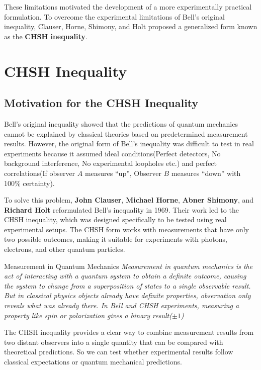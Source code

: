 \documentclass[14pt,a4paper]{extarticle}
\begin{document}
These limitations motivated the development of a more experimentally practical formulation. To overcome the experimental limitations of Bell’s original inequality, Clauser, Horne, Shimony, and Holt proposed a generalized form known as the \textbf{CHSH inequality}.

\section{CHSH Inequality}
\subsection{Motivation for the CHSH Inequality}
Bell’s original inequality showed that the predictions of quantum mechanics cannot be explained by classical theories based on predetermined measurement results. However, the original form of Bell’s inequality was difficult to test in real experiments because it assumed ideal conditions(Perfect detectors, No background interference, No experimental loopholes etc.) and perfect correlations(If observer $A$ measures “up”, Observer $B$ measures “down” with 100\% certainty).

To solve this problem, \textbf{John Clauser}, \textbf{Michael Horne}, \textbf{Abner Shimony}, and \textbf{Richard Holt} reformulated Bell’s inequality in 1969. Their work led to the CHSH inequality, which was designed specifically to be tested using real experimental setups. The CHSH form works with measurements that have only two possible outcomes, making it suitable for experiments with photons, electrons, and other quantum particles.

\begin{conceptbox}{Measurement in Quantum Mechanics}
\textit{Measurement in quantum mechanics is the act of interacting with a quantum system to obtain a definite outcome, causing the system to change from a superposition of states to a single observable result. But in classical physics objects already have definite properties, observation only reveals what was already there. In Bell and CHSH experiments, measuring a property like spin or polarization gives a binary result($\pm1$)}
\end{conceptbox}

The CHSH inequality provides a clear way to combine measurement results from two distant observers into a single quantity that can be compared with theoretical predictions. So we can test whether experimental results follow classical expectations or quantum mechanical predictions.
\end{document}
